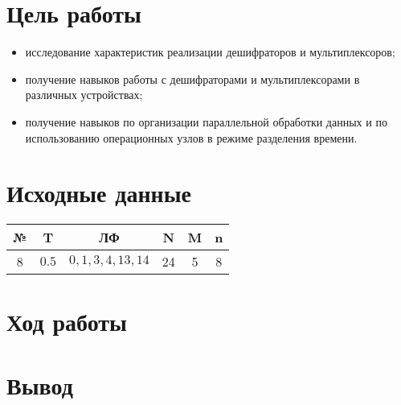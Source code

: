 \documentclass[a4paper,12pt]{article}
\begin{document}
    

    \tableofcontents

    \section{Цель работы}
    \begin{itemize}
        \item исследование характеристик реализации дешифраторов и мультиплексоров;
        \item получение навыков работы с дешифраторами и мультиплексорами в различных устройствах;
        \item получение навыков по организации параллельной обработки данных и по использованию
        операционных узлов в режиме разделения времени.
    \end{itemize}
    \section{Исходные данные}
    \begin{table}[H]
        \centering
        \begin{tabular}{|c|c|c|c|c|c|}
        \hline
        № & \textbf{T}       & ЛФ              & \textbf{N} & \textbf{M} & \textbf{n} \\ \hline
        8 & $0.5$            & $0,1,3,4,13,14$ & 24         & 5          & 8          \\ \hline
        \end{tabular}
    \end{table}
    \section{Ход работы}
    \section{Вывод}
    
\end{document}
